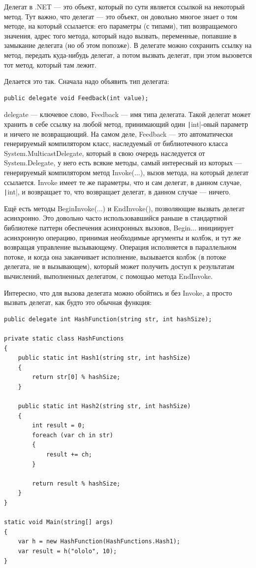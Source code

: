 \documentclass[a5paper]{article}
\begin{document}
Делегат в .NET --- это объект, который по сути является ссылкой на некоторый метод. Тут важно, что делегат --- это объект, он довольно многое знает о том методе, на который ссылается: его параметры (с типами), тип возвращаемого значения, адрес того метода, который надо вызвать, переменные, попавшие в замыкание делегата (но об этом попозже). В делегате можно сохранить ссылку на метод, передать куда-нибудь делегат, а потом вызвать делегат, при этом вызовется тот метод, который там лежит. 

Делается это так. Сначала надо объявить тип делегата:

\begin{verbatim}
public delegate void Feedback(int value);
\end{verbatim}

delegate --- ключевое слово, Feedback --- имя типа делегата. Такой делегат может хранить в себе ссылку на любой метод, принимающий один \texttt|int|-овый параметр и ничего не возвращающий. На самом деле, Feedback --- это автоматически генерируемый компилятором класс, наследуемый от библиотечного класса System.MulticastDelegate, который в свою очередь наследуется от System.Delegate, у него есть всякие методы, самый интересный из которых --- генерируемый компилятором метод Invoke(...), вызов метода, на который делегат ссылается. Invoke имеет те же параметры, что и сам делегат, в данном случае, \texttt|int|, и возвращает то, что возвращает делегат, в данном случае --- ничего. 

Ещё есть методы BeginInvoke(...) и EndInvoke(), позволяющие вызвать делегат асинхронно. Это довольно часто использовавшийся раньше в стандартной библиотеке паттерн обеспечения асинхронных вызовов, Begin... инициирует асинхронную операцию, принимая необходимые аргументы и колбэк, и тут же возвращая управление вызывающему. Операция исполняется в параллельном потоке, и когда она заканчивает исполнение, вызывается колбэк (в потоке делегата, не в вызывающем), который может получить доступ к результатам вычислений, выполненных делегатом, с помощью метода EndInvoke.

Интересно, что для вызова делегата можно обойтись и без Invoke, а просто вызвать делегат, как будто это обычная функция:

\begin{verbatim}
public delegate int HashFunction(string str, int hashSize);

private static class HashFunctions
{
    public static int Hash1(string str, int hashSize)
    {
        return str[0] % hashSize;
    }

    public static int Hash2(string str, int hashSize)
    {
        int result = 0;
        foreach (var ch in str)
        {
            result += ch;
        }

        return result % hashSize;
    }
}

static void Main(string[] args)
{
    var h = new HashFunction(HashFunctions.Hash1);
    var result = h("ololo", 10);
}
\end{verbatim}
\end{document}
